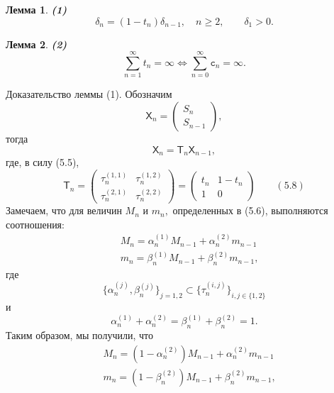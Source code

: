 \documentclass[12pt,a4paper]{article}
\theoremstyle{plain}   \newtheorem{Pro}{Задача}
\newtheorem{Lem}{Лемма}
\begin{document}
\begin{Lem}
{\bfseries (1)}
$$
  \delta _n =(1-t_n )\delta _{n-1},
   \quad n \geqslant 2, \qquad \delta _1 >0.
$$
\end{Lem}
\begin{Lem}
{\bfseries (2)}
$$
  \sum _{n=1}^{\infty}t_n =\infty
    \Longleftrightarrow
	  \sum _{n=0}^{\infty} \mathtt{c}_n =\infty .
$$
\end{Lem}
{\Large Доказательство леммы (1).}
Обозначим
\begin{equation*}
  \mathsf{X}_n=
    \begin{pmatrix}
	  S_n \\
	  S_{n-1}
	\end{pmatrix}
 ,
\end{equation*}
тогда
\begin{equation*}
  \mathsf{X}_n =\mathsf{T}_n \mathsf{X}_{n-1},
\end{equation*}
где, в силу (5.5),
\begin{equation*}
  \mathsf{T}_n =
    \begin{pmatrix}
	  \tau _n ^{(1,1)} & \tau _n ^{(1,2)} \\
	  \tau _n ^{(2,1)} & \tau _n ^{(2,2)}
	\end{pmatrix}
  =
    \begin{pmatrix}
	  t_n & 1-t_n \\
	  1 & 0
	\end{pmatrix}
  \qquad (5.8)
\end{equation*}
Замечаем, что для величин
$ M_n $
и
$ m_n , $
определенных в (5.6), выполняются соотношения:
\begin{align*}
  \; & M_n = \alpha _n ^{(1)} M_{n-1}+
    \alpha _n ^{(2)} m_{n-1} \\
  \; & m_n =\beta _n ^{(1)} M_{n-1} +
    \beta _n ^{(2)}m_{n-1},
\end{align*}
где
\begin{equation*}
  \{ \alpha _n ^{(j)} , \beta _n ^{(j)} \} _{j=1,2}
    \subset \{ \tau _n ^{(i,j)} \} _{i,j \in \{ 1,2 \} }
\end{equation*}
и
\begin{equation*}
  \alpha _n ^{(1)} +\alpha _n ^{(2)} =
    \beta _n ^{(1)} + \beta _n ^{(2)} =1 .
\end{equation*}
Таким образом, мы получили, что
\begin{align*}
  \; & M_n =(1-\alpha _n ^{(2)}) M_{n-1}+
     \alpha _n ^{(2)} m_{n-1} \\
  \; & m_n =(1 - \beta _n ^{(2)})M_{n-1}+
    \beta _n ^{(2)} m_{n-1} ,
\end{align*}
\end{document}

